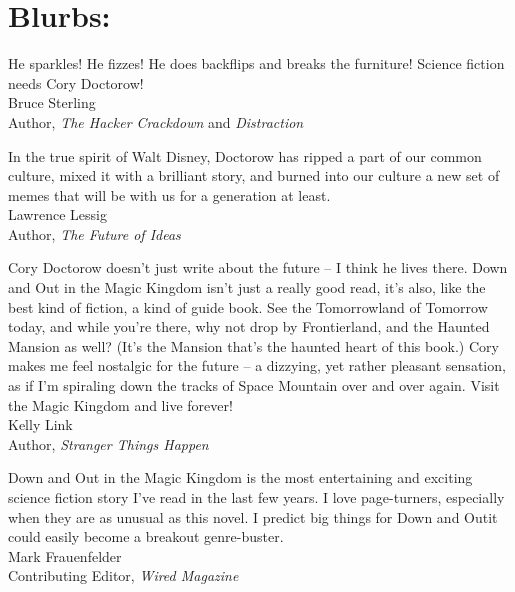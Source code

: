 \section{Blurbs:}
{
\setlength{\parindent}{0pt}

He sparkles! He fizzes! He does backflips and breaks the furniture!
Science fiction needs Cory Doctorow!
\\
\hspace*{\fill}Bruce Sterling
\\
\hspace*{\fill}Author, \emph{The Hacker Crackdown} and \emph{Distraction}

\bigskip

In the true spirit of Walt Disney, Doctorow has ripped a part of
our common culture, mixed it with a brilliant story, and burned
into our culture a new set of memes that will be with us for a
generation at least.
\\
\hspace*{\fill}Lawrence Lessig
\\
\hspace*{\fill}Author, \emph{The Future of Ideas}

\bigskip

Cory Doctorow doesn't just write about the future -- I think he
lives there. Down and Out in the Magic Kingdom isn't just a really
good read, it's also, like the best kind of fiction, a kind of
guide book. See the Tomorrowland of Tomorrow today, and while
you're there, why not drop by Frontierland, and the Haunted Mansion
as well? (It's the Mansion that's the haunted heart of this book.)
Cory makes me feel nostalgic for the future -- a dizzying, yet
rather pleasant sensation, as if I'm spiraling down the tracks of
Space Mountain over and over again. Visit the Magic Kingdom and
live forever!
\\
\hspace*{\fill}Kelly Link
\\
\hspace*{\fill}Author, \emph{Stranger Things Happen}

\bigskip

Down and Out in the Magic Kingdom is the most entertaining and
exciting science fiction story I've read in the last few years. I
love page-turners, especially when they are as unusual as this
novel. I predict big things for Down and Out{\dash}it could easily become
a breakout genre-buster.
\\
\hspace*{\fill}Mark Frauenfelder
\\
\hspace*{\fill}Contributing Editor, \emph{Wired Magazine}

}
